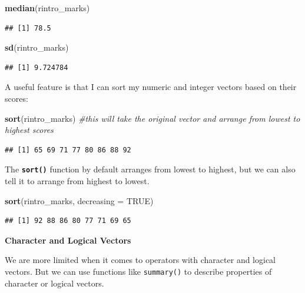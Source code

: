 \documentclass[
]{book}
\newenvironment{Shaded}{\begin{snugshade}}{\end{snugshade}}
\newcommand{\AttributeTok}[1]{\textcolor[rgb]{0.13,0.29,0.53}{#1}}
\newcommand{\CommentTok}[1]{\textcolor[rgb]{0.56,0.35,0.01}{\textit{#1}}}
\newcommand{\ConstantTok}[1]{\textcolor[rgb]{0.56,0.35,0.01}{#1}}
\newcommand{\FunctionTok}[1]{\textcolor[rgb]{0.13,0.29,0.53}{\textbf{#1}}}
\newcommand{\NormalTok}[1]{#1}
\begin{document}
\begin{Shaded}
\begin{Highlighting}[]
\FunctionTok{median}\NormalTok{(rintro\_marks)}
\end{Highlighting}
\end{Shaded}

\begin{verbatim}
## [1] 78.5
\end{verbatim}

\begin{Shaded}
\begin{Highlighting}[]
\FunctionTok{sd}\NormalTok{(rintro\_marks)}
\end{Highlighting}
\end{Shaded}

\begin{verbatim}
## [1] 9.724784
\end{verbatim}

A useful feature is that I can sort my numeric and integer vectors based on their scores:

\begin{Shaded}
\begin{Highlighting}[]
\FunctionTok{sort}\NormalTok{(rintro\_marks) }\CommentTok{\#this will take the original vector and arrange from lowest to highest scores}
\end{Highlighting}
\end{Shaded}

\begin{verbatim}
## [1] 65 69 71 77 80 86 88 92
\end{verbatim}

The \textbf{\texttt{sort()}} function by default arranges from lowest to highest, but we can also tell it to arrange from highest to lowest.

\begin{Shaded}
\begin{Highlighting}[]
\FunctionTok{sort}\NormalTok{(rintro\_marks, }\AttributeTok{decreasing =} \ConstantTok{TRUE}\NormalTok{) }
\end{Highlighting}
\end{Shaded}

\begin{verbatim}
## [1] 92 88 86 80 77 71 69 65
\end{verbatim}

\textbf{Character and Logical Vectors}

We are more limited when it comes to operators with character and logical vectors. But we can use functions like \texttt{summary()} to describe properties of character or logical vectors.
\end{document}
